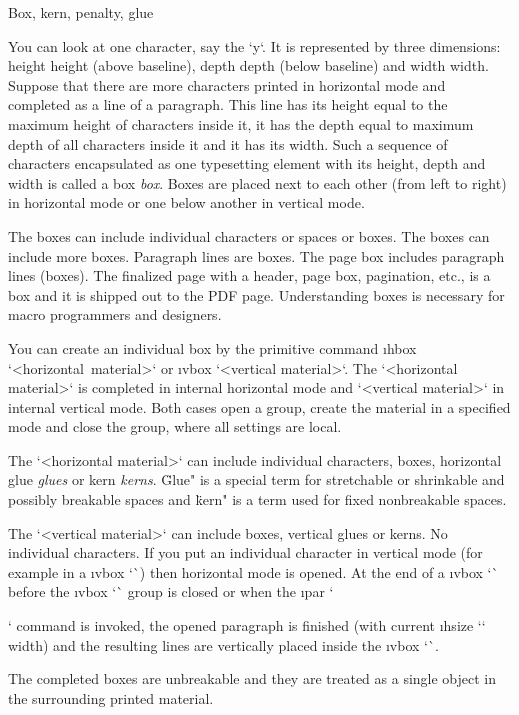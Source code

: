 \sec[boxes] Box, kern, penalty, glue

You can look at one character, say the `y`. It is represented by three
dimensions: \ii height height (above baseline), \ii depth depth (below baseline) 
and \ii width width.
Suppose that there are more characters printed in horizontal mode and
completed as a line of a paragraph. This line has its height equal to
the maximum height of characters inside it, it has the depth equal to maximum
depth of all characters inside it and it has its width. Such a sequence of
characters encapsulated as one typesetting element
with its height, depth and width is
called a \ii box {\em box}. Boxes are placed next to each other (from left to
right)
in horizontal mode or one below another in vertical mode. 

The boxes can include individual characters or spaces or boxes. The boxes can
include more boxes. Paragraph lines are boxes. The page box includes paragraph
lines (boxes). The finalized page with a header, page box, pagination,
etc., is a box and it is shipped out to the PDF page. Understanding boxes is
necessary for macro programmers and designers.

You can create an individual box by the primitive command
\i hbox `\hbox{<horizontal material>}`
or \i vbox `\vbox{<vertical material>}`. The `<horizontal material>` is completed in
internal horizontal mode and `<vertical material>` in internal vertical
mode. Both cases open a group, create the material in a specified
mode and close the group, where all settings are local.

The `<horizontal material>` can include individual characters, boxes,
horizontal \ii glue {\em glues} or \ii kern {\em kerns}. \"Glue" is a special term for
stretchable or shrinkable and possibly breakable spaces and \"kern" is a 
term used for fixed nonbreakable spaces.

The `<vertical material>` can include boxes, vertical glues or kerns. No
individual characters. If you put an individual character in
vertical mode (for example in a \i vbox `\vbox`)
then horizontal mode is opened. At the end of a \i vbox `\vbox`\fnote 
{before the \i vbox `\vbox` group is closed}
or when the \i par `\par` command is invoked, the opened paragraph is finished (with
current \i hsize `\hsize` width) and the resulting lines are vertically placed
inside the \i vbox `\vbox`. 

The completed boxes are unbreakable and they are treated as a single object in
the surrounding printed material. 

